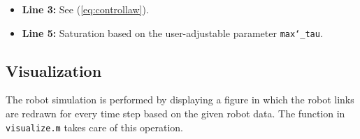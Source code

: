 \begin{itemize}
    \item \textbf{Line 3:} See (\ref{eq:controllaw}).
    \item \textbf{Line 5:} Saturation based on the user-adjustable parameter \texttt{max\char`_tau}.
\end{itemize}



\subsection{Visualization}

The robot simulation is performed by displaying a figure in which the robot links are redrawn for every time step based on the given robot data. The function in \texttt{visualize.m} takes care of this operation.